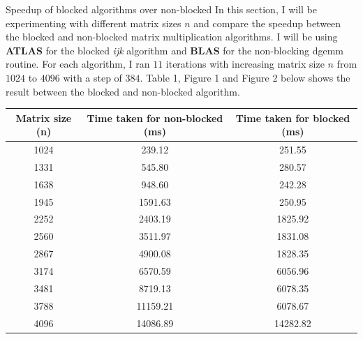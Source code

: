 \documentclass[12pt]{article}
\begin{document}
\begin{section}{Speedup of blocked algorithms over non-blocked}
 In this section, I will be experimenting with different matrix sizes $n$ and compare the speedup between the blocked and non-blocked matrix multiplication algorithms.
 I will be using \textbf{ATLAS} for the blocked \textit{ijk} algorithm and \textbf{BLAS} for the non-blocking dgemm routine. For each algorithm, I ran $11$ iterations
 with increasing matrix size $n$ from $1024$ to $4096$ with a step of $384$. Table 1, Figure 1 and Figure 2 below shows the result between the blocked and non-blocked algorithm.

 \begin{center}
     \begin{tabular}{|c | c | c|}
         \hline
         \textbf{Matrix size (n)} & \textbf{Time taken for non-blocked (ms)} & \textbf{Time taken for blocked (ms)} \\ [0.5ex]
         \hline
         1024                     & 239.12                                   & 251.55                               \\
         \hline
         1331                     & 545.80                                   & 280.57                               \\
         \hline
         1638                     & 948.60                                   & 242.28                               \\
         \hline
         1945                     & 1591.63                                  & 250.95                               \\
         \hline
         2252                     & 2403.19                                  & 1825.92                              \\
         \hline
         2560                     & 3511.97                                  & 1831.08                              \\
         \hline
         2867                     & 4900.08                                  & 1828.35                              \\
         \hline
         3174                     & 6570.59                                  & 6056.96                              \\
         \hline
         3481                     & 8719.13                                  & 6078.35                              \\
         \hline
         3788                     & 11159.21                                 & 6078.67                              \\
         \hline
         4096                     & 14086.89                                 & 14282.82                             \\ [1ex]
         \hline
     \end{tabular}
 \end{center}


\end{section}
\end{document}
